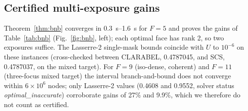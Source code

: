 \documentclass[11pt,a4paper]{article}
\newcommand{\R}{\mathbb{R}}\newcommand{\C}{\mathbb{C}}\newcommand{\PSD}{\succeq 0}
\begin{document}
\subsection{Certified multi-exposure gains}
Theorem~\ref{thm:bnb} converges in \SIrange{0.3}{1.6}{s} for $F=5$ and proves the gains of Table~\ref{tab:bnb} (Fig.~\ref{fig:bnb}, left); each optimal face has rank 2, so two exposures suffice. The Lasserre-2 single-mask bounds coincide with $U$ to $10^{-6}$ on these instances (cross-checked between CLARABEL, 0.4787045, and SCS, 0.4787037, on the mixed target). For $F=9$ (iso-dense, coherent) and $F=11$ (three-focus mixed target) the interval branch-and-bound does not converge within $6\times10^6$ nodes; only Lasserre-2 values (0.4608 and 0.9552, solver status \emph{optimal\_inaccurate}) corroborate gains of 27\% and 9.9\%, which we therefore do not count as certified.
\begin{table}[tbp]\centering\small
\caption{Rigorous separation of single- and multi-exposure optima by the interval branch-and-bound of Theorem~\ref{thm:bnb} (DUV, coherent illumination). $F$: collected orders; SDP bound: rigorized certificate value $t_R$ (optimum over any number of exposures); B\&B $L$: certified lower bound on the single-mask optimum $\rhostar(\mathcal M_\R)$; best single $U$: incumbent, so that $L\le\rhostar(\mathcal M_\R)\le U$; nodes: branch-and-bound nodes explored; converged: whether $L\ge(1-\mathrm{tol})U$ was reached; certified gain $=(L-\text{SDP bound})/\text{SDP bound}$, a rigorous lower bound on the multi-exposure improvement in $\rho$. ``random $n$'' are instances of the random one-dimensional set.}\label{tab:bnb}
\end{table}
\end{document}
